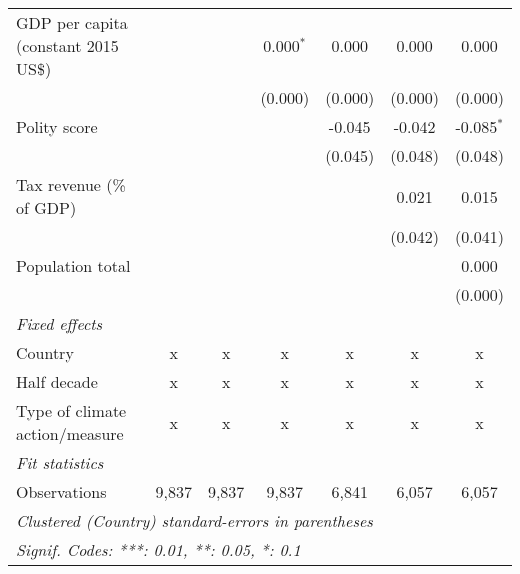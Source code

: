 \begin{tabular}{lcccccc}
   GDP per capita (constant 2015 US\$)                                                             &                &                & 0.000$^{*}$    & 0.000          & 0.000          & 0.000\\   
                                                                                                   &                &                & (0.000)        & (0.000)        & (0.000)        & (0.000)\\   
   Polity score                                                                                    &                &                &                & -0.045         & -0.042         & -0.085$^{*}$\\   
                                                                                                   &                &                &                & (0.045)        & (0.048)        & (0.048)\\   
   Tax revenue (\% of GDP)                                                                         &                &                &                &                & 0.021          & 0.015\\   
                                                                                                   &                &                &                &                & (0.042)        & (0.041)\\   
   Population total                                                                                &                &                &                &                &                & 0.000\\   
                                                                                                   &                &                &                &                &                & (0.000)\\   
   \emph{Fixed effects}\\
   Country                                                                                         & x              & x              & x              & x              & x              & x\\  
   Half decade                                                                                     & x              & x              & x              & x              & x              & x\\  
   Type of climate action/measure                                                                  & x              & x              & x              & x              & x              & x\\  
   \midrule \emph{Fit statistics}\\
   Observations                                                                                    & 9,837          & 9,837          & 9,837          & 6,841          & 6,057          & 6,057\\  
   \midrule
   \multicolumn{7}{l}{\emph{Clustered (Country) standard-errors in parentheses}}\\
   \multicolumn{7}{l}{\emph{Signif. Codes: ***: 0.01, **: 0.05, *: 0.1}}\\
\end{tabular}
\par\endgroup


